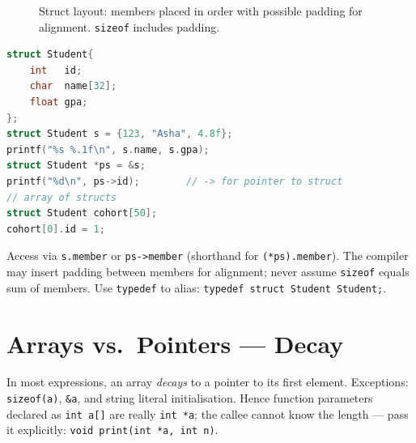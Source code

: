\begin{figure}[h]\centering
{}
\caption{Struct layout: members placed in order with possible padding for alignment. \texttt{sizeof} includes padding.}
\label{fig:struct-layout}
\end{figure}

\begin{lstlisting}[language=C]
struct Student{
    int   id;
    char  name[32];
    float gpa;
};
struct Student s = {123, "Asha", 4.8f};
printf("%s %.1f\n", s.name, s.gpa);
struct Student *ps = &s;
printf("%d\n", ps->id);        // -> for pointer to struct
// array of structs
struct Student cohort[50];
cohort[0].id = 1;
\end{lstlisting}
Access via \texttt{s.member} or \texttt{ps->member} (shorthand for \texttt{(*ps).member}). The compiler may insert padding between members for alignment; never assume \texttt{sizeof} equals sum of members. Use \texttt{typedef} to alias: \texttt{typedef struct Student Student;}.

\section{Arrays vs.\ Pointers --- Decay}
In most expressions, an array \emph{decays} to a pointer to its first element. Exceptions: \texttt{sizeof(a)}, \texttt{\&a}, and string literal initialisation. Hence function parameters declared as \texttt{int a[]} are really \texttt{int *a}; the callee cannot know the length --- pass it explicitly: \texttt{void print(int *a, int n)}.


